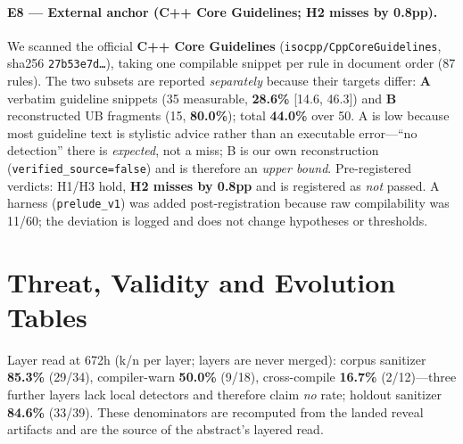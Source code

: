 \documentclass{article}
\begin{document}
\paragraph{E8 --- External anchor (C++ Core Guidelines; H2 misses by 0.8pp).}
We scanned the official \textbf{C++ Core Guidelines} (\texttt{isocpp/CppCoreGuidelines}, sha256
\texttt{27b53e7d\ldots}), taking one compilable snippet per rule in document order (87 rules). The two
subsets are reported \emph{separately} because their targets differ: \textbf{A} verbatim guideline
snippets (35 measurable, \textbf{28.6\%} [14.6, 46.3]) and \textbf{B} reconstructed UB fragments
(15, \textbf{80.0\%}); total \textbf{44.0\%} over 50. A is low because most guideline text is
stylistic advice rather than an executable error---``no detection'' there is \emph{expected}, not a
miss; B is our own reconstruction (\texttt{verified\_source=false}) and is therefore an \emph{upper
bound}. Pre-registered verdicts: H1/H3 hold, \textbf{H2 misses by 0.8pp} and is registered as
\emph{not} passed. A harness (\texttt{prelude\_v1}) was added post-registration because raw
compilability was 11/60; the deviation is logged and does not change hypotheses or thresholds.

\section{Threat, Validity and Evolution Tables}
\label{app:tables}
Layer read at 672h (k/n per layer; layers are never merged): corpus sanitizer
\textbf{85.3\%} (29/34), compiler-warn \textbf{50.0\%} (9/18), cross-compile \textbf{16.7\%}
(2/12)---three further layers lack local detectors and therefore claim \emph{no} rate; holdout
sanitizer \textbf{84.6\%} (33/39). These denominators are recomputed from the landed reveal
artifacts and are the source of the abstract's layered read.
\end{document}
